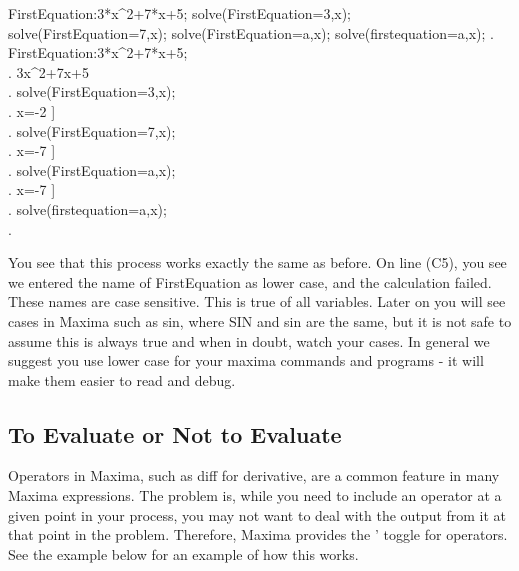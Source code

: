 \beginmaximasession
FirstEquation:3*x^2+7*x+5;
solve(FirstEquation=3,x);
solve(FirstEquation=7,x);
solve(FirstEquation=a,x);
solve(firstequation=a,x);
\maximatexsession
{}.  FirstEquation:3*x^2+7*x+5; \\
.   3\*x^{2}+7\*x+5 \\
.  solve(FirstEquation=3,x); \\
.   \left[ x=-{{1}\over{3}},\linebreak[0]x=-2 \right]  \\
.  solve(FirstEquation=7,x); \\
.   \left[ x=-{{\sqrt{73}+7}\over{6}},\linebreak[0]x={{-7
 }} \right]  \\
.  solve(FirstEquation=a,x); \\
.   \left[ x=-{{\sqrt{12\*a-11}+7}\over{6}},\linebreak[0]x={{-7}} \right]  \\
.  solve(firstequation=a,x); \\
.   \left[  \right]  \\
\endmaximasession

\vspace{3ex}

You see that this process works exactly the same as before. On line
(C5), you see we entered the name of FirstEquation as lower case,
and the calculation failed. These names are case sensitive. This is
true of all variables. Later on you will see cases in Maxima such
as sin, where SIN and sin are the same, but it is not safe to assume
this is always true and when in doubt, watch your cases. In general 
we suggest you use lower case for your maxima commands and programs - 
it will make them easier to read and debug.


\subsection{To Evaluate or Not to Evaluate}

Operators in Maxima, such as diff for derivative, are a common feature
in many Maxima expressions. The problem is, while you need to include
an operator at a given point in your process, you may not want to
deal with the output from it at that point in the problem. Therefore,
Maxima provides the ' toggle for operators. See the example below
for an example of how this works.

\vspace{3ex}

